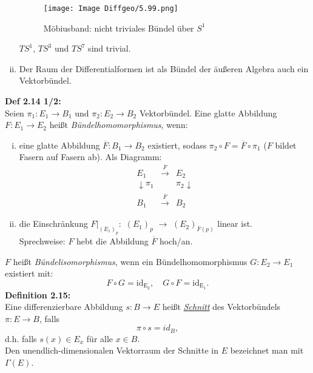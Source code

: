 \documentclass[fleqn, 12pt, letterpaper]{article}
\begin{document}
\begin{enumerate}[i)]
      \begin{figure}[H]
    \centering
    \texttt{[image: Image Diffgeo/5.99.png]}
	\caption{Möbiusband: nicht triviales Bündel über $S^1$}
 \end{figure}

    \(TS^1\), \(TS^3\) und \(TS^7\) sind trivial.

    \item Der Raum der Differentialformen ist als Bündel der äußeren Algebra auch ein Vektorbündel.
\end{enumerate}

\textbf{Def 2.14 1/2:} \\
Seien \(\pi_1: E_1 \to B_1\) und \(\pi_2: E_2 \to B_2\) Vektorbündel.  
Eine glatte Abbildung \(F:E_1\longrightarrow E_2\) heißt \emph{Bündelhomomorphismus}, wenn:
\begin{enumerate}[i)]
    \item eine glatte Abbildung \(\overline{F}:B_1\longrightarrow B_2\) existiert, sodass \(\pi_2\circ F = \overline{F}\circ \pi_1\) \quad (\(F\) bildet Fasern auf Fasern ab). Als Diagramm:
 \[
\begin{array}{ccc}
E_1 & \xrightarrow{F} & E_2 \\
\downarrow \pi_1 & & \pi_2 \downarrow \\
B_1 & \xrightarrow{\overline{F}} & B_2
\end{array}
\]

    \item die Einschränkung \(F|_{(E_1)_p}:\) $(E_1)_p$ \(\longrightarrow\)  $(E_2)_{\overline{F}(p)}$  linear ist.\\
    Sprechweise: \(F\) hebt die Abbildung \(\overline{F}\) hoch/an.
\end{enumerate}

\(F\) heißt \emph{Bündelisomorphismus}, wenn ein Bündelhomomorphismus \(G: E_2 \to E_1\) existiert mit:
\[
F \circ G = \mathrm{id_{E_2}}, \quad G \circ F = \mathrm{id_{E_1}}.
\]
\textbf{Definition 2.15:} \\
Eine differenzierbare Abbildung \(s: B \to E\) heißt \emph{\underline{Schnitt}} des Vektorbündels $\pi:E\to B$, falls
\[
\pi\circ s = id_B,
\]
d.h. falls \(s(x) \in E_x\) für alle \(x \in B\).\\
Den unendlich-dimensionalen Vektorraum der Schnitte in \(E\) bezeichnet man mit \(\Gamma(E)\).\\
\end{document}
